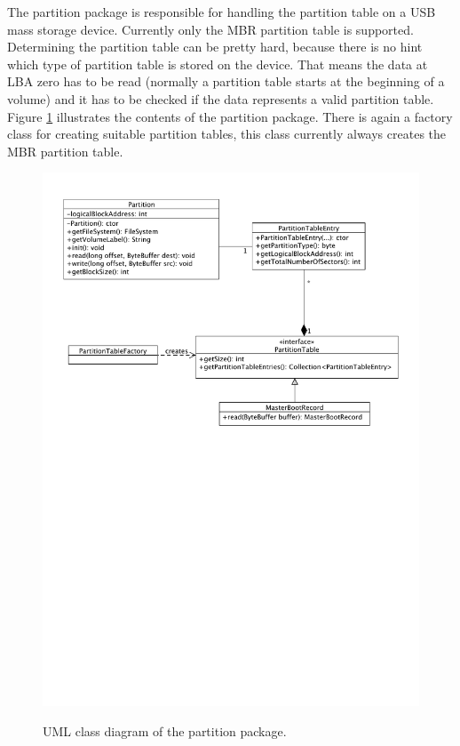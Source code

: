 The partition package is responsible for handling the partition table on a USB mass storage device. Currently only the MBR partition table is supported. Determining the partition table can be pretty hard, because there is no hint which type of partition table is stored on the device. That means the data at LBA zero has to be read (normally a partition table starts at the beginning of a volume) and it has to be checked if the data represents a valid partition table. Figure \ref{figure:partition_package} illustrates the contents of the partition package. There is again a factory class for creating suitable partition tables, this class currently always creates the MBR partition table.

\begin{figure}[h!]
\caption{UML class diagram of the partition package.}
\centering
\includegraphics[scale=0.85]{figures/partition_package}
\label{figure:partition_package}
\end{figure}

